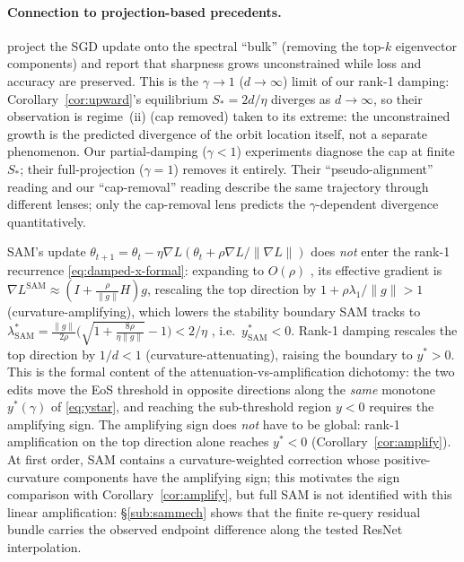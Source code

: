 \paragraph{Connection to projection-based precedents.}
\citet{song2025bulk} project the SGD update onto the spectral ``bulk'' (removing
the top-$k$ eigenvector components) and report that sharpness grows unconstrained
while loss and accuracy are preserved. This is the $\gamma\!\to\!1$
($d\!\to\!\infty$) limit of our rank-1 damping: Corollary~\ref{cor:upward}'s
equilibrium $S_{*}=2d/\eta$ diverges as $d\!\to\!\infty$, so their observation
is regime~(ii) (cap removed) taken to its extreme: the unconstrained growth is
the predicted divergence of the orbit location itself, not a separate phenomenon.
Our partial-damping ($\gamma<1$) experiments diagnose the cap at finite
$S_{*}$; their full-projection ($\gamma=1$) removes it entirely. Their
``pseudo-alignment'' reading and our ``cap-removal'' reading describe the same
trajectory through different lenses; only the cap-removal lens predicts the
$\gamma$-dependent divergence quantitatively.

\begin{remark}
\label{cor:sam}
SAM's update $\theta_{t+1}=\theta_{t}-\eta\nabla L(\theta_{t}+\rho\nabla L/\|\nabla L\|)$
does \emph{not} enter the rank-1 recurrence \eqref{eq:damped-x-formal}: expanding
to $O(\rho)$ \citep{andriushchenko2022sam}, its effective gradient is
$\nabla L^{\mathrm{SAM}}\approx(I+\tfrac{\rho}{\|g\|}H)g$, rescaling the top
direction by $1+\rho\lambda_{1}/\|g\|>1$ (curvature-amplifying), which lowers the
stability boundary SAM tracks to
$\lambda^{*}_{\mathrm{SAM}}=\tfrac{\|g\|}{2\rho}\bigl(\sqrt{1+\tfrac{8\rho}{\eta\|g\|}}-1\bigr)<2/\eta$
\citep{long2024sam}, i.e.\ $y^{*}_{\mathrm{SAM}}<0$. Rank-1 damping rescales the
top direction by $1/d<1$ (curvature-attenuating), raising the boundary to
$y^{*}>0$. This is the formal content of the attenuation-vs-amplification
dichotomy: the two edits move the EoS threshold in opposite directions
along the \emph{same} monotone $y^{*}(\gamma)$ of \eqref{eq:ystar}, and
reaching the sub-threshold region $y<0$ requires the amplifying sign. The
amplifying sign does \emph{not} have to be global: rank-1 amplification on the
top direction alone reaches $y^{*}<0$ (Corollary~\ref{cor:amplify}). At
first order, SAM contains a curvature-weighted correction whose
positive-curvature components have the amplifying sign; this motivates the
sign comparison with Corollary~\ref{cor:amplify}, but full SAM is not
identified with this linear amplification: \S\ref{sub:sammech} shows
that the finite re-query residual bundle carries the observed
endpoint difference along the tested ResNet interpolation.
\end{remark}

